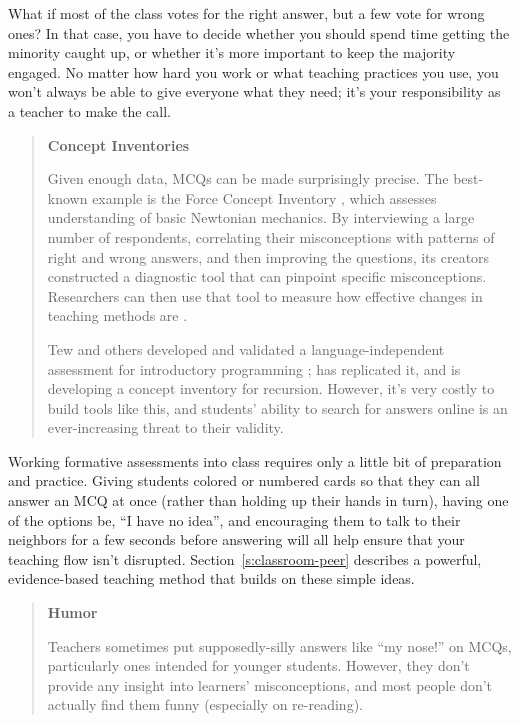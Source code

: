 What if most of the class votes for the right answer, but a few vote for
wrong ones? In that case, you have to decide whether you should spend
time getting the minority caught up, or whether it's more important to
keep the majority engaged. No matter how hard you work or what teaching
practices you use, you won't always be able to give everyone what they
need; it's your responsibility as a teacher to make the call.

\begin{quote}\setlength{\parindent}{0pt}
\textbf{Concept Inventories}

Given enough data, MCQs can be made surprisingly precise. The
best-known example is the Force Concept Inventory \cite{Hest1992},
which assesses understanding of basic Newtonian mechanics. By
interviewing a large number of respondents, correlating their
misconceptions with patterns of right and wrong answers, and then
improving the questions, its creators constructed a diagnostic tool
that can pinpoint specific misconceptions. Researchers can then use
that tool to measure how effective changes in teaching methods are
\cite{Hake1998}.

Tew and others developed and validated a language-independent
assessment for introductory programming \cite{Tew2011};
\cite{Park2016} has replicated it, and \cite{Hamo2017} is
developing a concept inventory for recursion. However, it's very
costly to build tools like this, and students' ability to search for
answers online is an ever-increasing threat to their validity.
\end{quote}

Working formative assessments into class requires only a little bit of
preparation and practice. Giving students colored or numbered cards so
that they can all answer an MCQ at once (rather than holding up their
hands in turn), having one of the options be, ``I have no idea'', and
encouraging them to talk to their neighbors for a few seconds before
answering will all help ensure that your teaching flow isn't disrupted.
Section~\ref{s:classroom-peer} describes a powerful, evidence-based
teaching method that builds on these simple ideas.

\begin{quote}\setlength{\parindent}{0pt}
\textbf{Humor}

Teachers sometimes put supposedly-silly answers like ``my nose!'' on
MCQs, particularly ones intended for younger students. However, they
don't provide any insight into learners' misconceptions, and most
people don't actually find them funny (especially on re-reading).
\end{quote}

